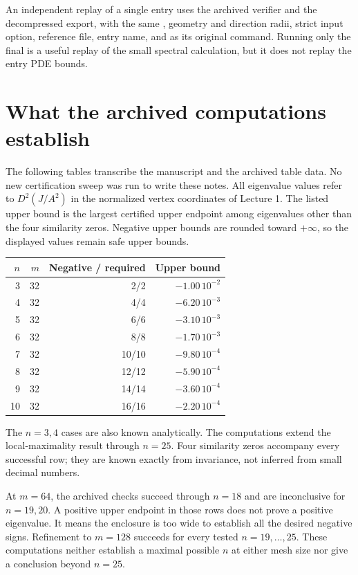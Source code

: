 An independent replay of a single entry uses the archived verifier and
the decompressed export, with the same , geometry and
direction radii, strict input option, reference file, entry name, and
 as its original command. Running only the final
 is a useful replay of the small spectral calculation,
but it does not replay the entry PDE bounds.

\section{What the archived computations establish}
\label{l3:results}
The following tables transcribe the manuscript and the archived table
data. No new certification sweep was run to write these notes. All
eigenvalue values refer to $D^2(J/A^2)$ in the normalized vertex coordinates
of Lecture 1. The listed upper bound is the largest certified upper
endpoint among eigenvalues other than the four similarity zeros. Negative
upper bounds are rounded toward $+\infty$, so the displayed values remain
safe upper bounds.

\begin{center}
\begin{tabular}{@{}rrrr@{}}
\toprule
$n$ & $m$ & Negative / required & Upper bound\\\midrule
3&32&2/2&$-1.00\,10^{-2}$\\
4&32&4/4&$-6.20\,10^{-3}$\\
5&32&6/6&$-3.10\,10^{-3}$\\
6&32&8/8&$-1.70\,10^{-3}$\\
7&32&10/10&$-9.80\,10^{-4}$\\
8&32&12/12&$-5.90\,10^{-4}$\\
9&32&14/14&$-3.60\,10^{-4}$\\
10&32&16/16&$-2.20\,10^{-4}$\\
\bottomrule
\end{tabular}
\end{center}
The $n=3,4$ cases are also known analytically. The computations extend the
local-maximality result through $n=25$. Four similarity zeros accompany
every successful row; they are known exactly from invariance, not inferred
from small decimal numbers.



At $m=64$, the archived checks succeed through $n=18$ and are inconclusive
for $n=19,20$. A positive upper endpoint in those rows does not prove a
positive eigenvalue. It means the enclosure is too wide to establish all
the desired negative signs. Refinement to $m=128$ succeeds for every tested
$n=19,\ldots,25$. These computations neither establish a maximal possible
$n$ at either mesh size nor give a conclusion beyond $n=25$.

